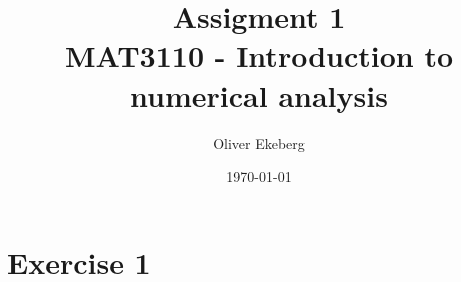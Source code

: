 \documentclass[11pt]{article}
\title{Assigment 1 \\ MAT3110 - Introduction to numerical analysis}
\author{Oliver Ekeberg}
\date{\today}
\begin{document}
\maketitle


\tableofcontents

\section{Exercise 1}
\end{document}
